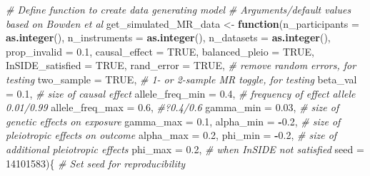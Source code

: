 \documentclass[
]{article}
\newenvironment{Shaded}{\begin{snugshade}}{\end{snugshade}}
\newcommand{\AttributeTok}[1]{\textcolor[rgb]{0.13,0.29,0.53}{#1}}
\newcommand{\CommentTok}[1]{\textcolor[rgb]{0.56,0.35,0.01}{\textit{#1}}}
\newcommand{\ConstantTok}[1]{\textcolor[rgb]{0.56,0.35,0.01}{#1}}
\newcommand{\ControlFlowTok}[1]{\textcolor[rgb]{0.13,0.29,0.53}{\textbf{#1}}}
\newcommand{\DecValTok}[1]{\textcolor[rgb]{0.00,0.00,0.81}{#1}}
\newcommand{\FloatTok}[1]{\textcolor[rgb]{0.00,0.00,0.81}{#1}}
\newcommand{\FunctionTok}[1]{\textcolor[rgb]{0.13,0.29,0.53}{\textbf{#1}}}
\newcommand{\NormalTok}[1]{#1}
\newcommand{\OtherTok}[1]{\textcolor[rgb]{0.56,0.35,0.01}{#1}}
\newcommand{\SpecialCharTok}[1]{\textcolor[rgb]{0.81,0.36,0.00}{\textbf{#1}}}
\begin{document}
\begin{Shaded}
\begin{Highlighting}[]
\CommentTok{\# Define function to create data generating model}
\CommentTok{\# Arguments/default values based on Bowden et al}
\NormalTok{get\_simulated\_MR\_data }\OtherTok{\textless{}{-}} \ControlFlowTok{function}\NormalTok{(}\AttributeTok{n\_participants =} \FunctionTok{as.integer}\NormalTok{(), }
                                  \AttributeTok{n\_instruments =} \FunctionTok{as.integer}\NormalTok{(),}
                                  \AttributeTok{n\_datasets =} \FunctionTok{as.integer}\NormalTok{(),}
                                  \AttributeTok{prop\_invalid =} \FloatTok{0.1}\NormalTok{,}
                                  \AttributeTok{causal\_effect =} \ConstantTok{TRUE}\NormalTok{,}
                                  \AttributeTok{balanced\_pleio =} \ConstantTok{TRUE}\NormalTok{,}
                                  \AttributeTok{InSIDE\_satisfied =} \ConstantTok{TRUE}\NormalTok{,}
                                  \AttributeTok{rand\_error =} \ConstantTok{TRUE}\NormalTok{,      }\CommentTok{\# remove random errors, for testing}
                                  \AttributeTok{two\_sample =} \ConstantTok{TRUE}\NormalTok{,      }\CommentTok{\# 1{-} or 2{-}sample MR toggle, for testing}
                                  \AttributeTok{beta\_val =} \FloatTok{0.1}\NormalTok{,         }\CommentTok{\# size of causal effect}
                                  \AttributeTok{allele\_freq\_min =} \FloatTok{0.4}\NormalTok{,  }\CommentTok{\# frequency of effect allele 0.01/0.99}
                                  \AttributeTok{allele\_freq\_max =} \FloatTok{0.6}\NormalTok{,  }\CommentTok{\#?0.4/0.6}
                                  \AttributeTok{gamma\_min =} \FloatTok{0.03}\NormalTok{,       }\CommentTok{\# size of genetic effects on exposure}
                                  \AttributeTok{gamma\_max =} \FloatTok{0.1}\NormalTok{,}
                                  \AttributeTok{alpha\_min =} \SpecialCharTok{{-}}\FloatTok{0.2}\NormalTok{,       }\CommentTok{\# size of pleiotropic effects on outcome}
                                  \AttributeTok{alpha\_max =} \FloatTok{0.2}\NormalTok{,}
                                  \AttributeTok{phi\_min =} \SpecialCharTok{{-}}\FloatTok{0.2}\NormalTok{,         }\CommentTok{\# size of additional pleiotropic effects}
                                  \AttributeTok{phi\_max =} \FloatTok{0.2}\NormalTok{,          }\CommentTok{\# when InSIDE not satisfied}
                                  \AttributeTok{seed =} \DecValTok{14101583}\NormalTok{)\{       }\CommentTok{\# Set seed for reproducibility}
  

\end{Highlighting}
\end{Shaded}
\end{document}
